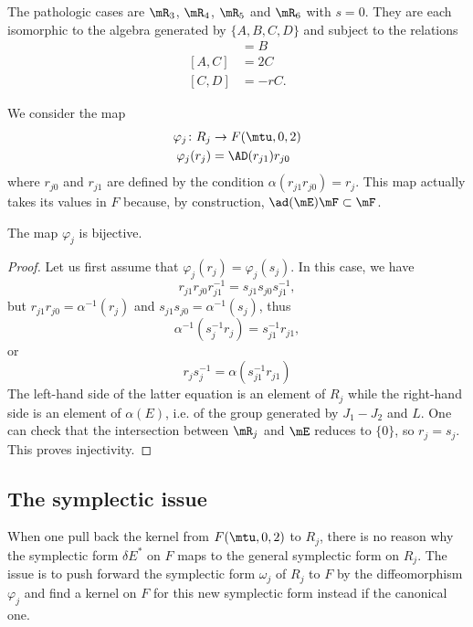 The pathologic cases are $\mR_{3}$, $\mR_{4}$, $\mR_{5}$ and $\mR_{6}$ with $s=0$.  They are each isomorphic to the algebra generated by $\{ A,B,C,D \}$ and subject to the relations
\begin{align*}
	[A,B] & =B    \\
	[A,C] & =2C   \\
	[C,D] & =-rC.
\end{align*}



We consider the map
\begin{equation}
	\begin{aligned}
		\varphi_j\colon R_j & \to F(\mtu,0,2)     \\
		\varphi_j(r_{j})    & = \AD(r_{j1})r_{j0}
	\end{aligned}
\end{equation}
where $r_{j0}$ and $r_{j1}$ are defined by the condition $\alpha(r_{j1}r_{j0})=r_{j}$. This map actually takes its values in $F$ because, by construction, $\ad(\mE)\mF\subset\mF$.

\begin{theorem}
	The map $\varphi_j$ is bijective.
\end{theorem}

\begin{proof}
	Let us first assume that $\varphi_j(r_{j})=\varphi_j(s_{j})$. In this case, we have
	\[
		r_{j1}r_{j0}r_{j1}^{-1}=s_{j1}s_{j0}s_{j1}^{-1},
	\]
	but $r_{j1}r_{j0}=\alpha^{-1}(r_{j})$ and $s_{j1}s_{j0}=\alpha^{-1}(s_{j})$, thus
	\[
		\alpha^{-1}(s_{j}^{-1}r_{j})=s_{j1}^{-1}r_{j1},
	\]
	or
	\[
		r_{j}s_{j}^{-1}=\alpha(s_{j1}^{-1}r_{j1})
	\]
	The left-hand side of the latter equation is an element of $R_{j}$ while the right-hand side is an element of $\alpha(E)$, i.e. of the group generated by $J_{1}-J_{2}$ and $L$. One can check that the intersection between $\mR_{j}$ and $\mE$ reduces to $\{ 0 \}$, so $r_{j}=s_{j}$. This proves injectivity.
\end{proof}

\subsection{The symplectic issue}

When one pull back the kernel from $F(\mtu,0,2)$ to $R_{j}$, there is no reason why the symplectic form $\delta E^*$ on $F$ maps to the general symplectic form on $R_j$. The issue is to push forward the symplectic form $\omega_{j}$ of $R_j$ to $F$ by the diffeomorphism $\varphi_j$ and find a kernel on $F$ for this new symplectic form instead if the canonical one.

